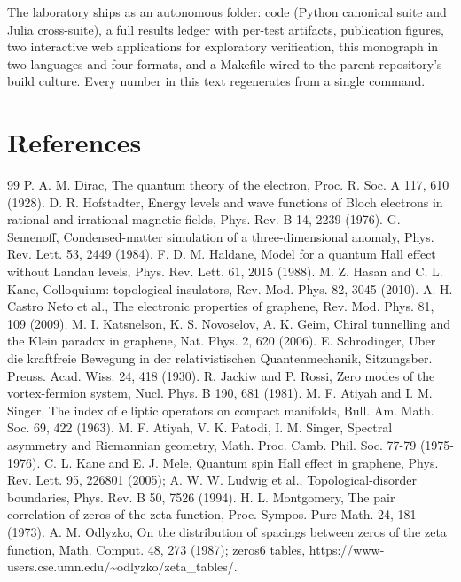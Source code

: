 \documentclass[11pt,a4paper]{article}
\begin{document}
The laboratory ships as an autonomous folder: code (Python canonical suite and Julia cross-suite), a full results ledger with per-test artifacts, publication figures, two interactive web applications for exploratory verification, this monograph in two languages and four formats, and a Makefile wired to the parent repository's build culture. Every number in this text regenerates from a single command.

\section*{References}
\begin{thebibliography}{99}\small
{} P. A. M. Dirac, The quantum theory of the electron, Proc. R. Soc. A 117, 610 (1928).
 D. R. Hofstadter, Energy levels and wave functions of Bloch electrons in rational and irrational magnetic fields, Phys. Rev. B 14, 2239 (1976).
 G. Semenoff, Condensed-matter simulation of a three-dimensional anomaly, Phys. Rev. Lett. 53, 2449 (1984).
 F. D. M. Haldane, Model for a quantum Hall effect without Landau levels, Phys. Rev. Lett. 61, 2015 (1988).
 M. Z. Hasan and C. L. Kane, Colloquium: topological insulators, Rev. Mod. Phys. 82, 3045 (2010).
 A. H. Castro Neto et al., The electronic properties of graphene, Rev. Mod. Phys. 81, 109 (2009).
 M. I. Katsnelson, K. S. Novoselov, A. K. Geim, Chiral tunnelling and the Klein paradox in graphene, Nat. Phys. 2, 620 (2006).
 E. Schrodinger, Uber die kraftfreie Bewegung in der relativistischen Quantenmechanik, Sitzungsber. Preuss. Acad. Wiss. 24, 418 (1930).
 R. Jackiw and P. Rossi, Zero modes of the vortex-fermion system, Nucl. Phys. B 190, 681 (1981).
 M. F. Atiyah and I. M. Singer, The index of elliptic operators on compact manifolds, Bull. Am. Math. Soc. 69, 422 (1963).
 M. F. Atiyah, V. K. Patodi, I. M. Singer, Spectral asymmetry and Riemannian geometry, Math. Proc. Camb. Phil. Soc. 77-79 (1975-1976).
 C. L. Kane and E. J. Mele, Quantum spin Hall effect in graphene, Phys. Rev. Lett. 95, 226801 (2005); A. W. W. Ludwig et al., Topological-disorder boundaries, Phys. Rev. B 50, 7526 (1994).
 H. L. Montgomery, The pair correlation of zeros of the zeta function, Proc. Sympos. Pure Math. 24, 181 (1973).
 A. M. Odlyzko, On the distribution of spacings between zeros of the zeta function, Math. Comput. 48, 273 (1987); zeros6 tables, https://www-users.cse.umn.edu/\textasciitilde{}odlyzko/zeta\_\allowbreak{}tables/.

\end{thebibliography}
\end{document}
